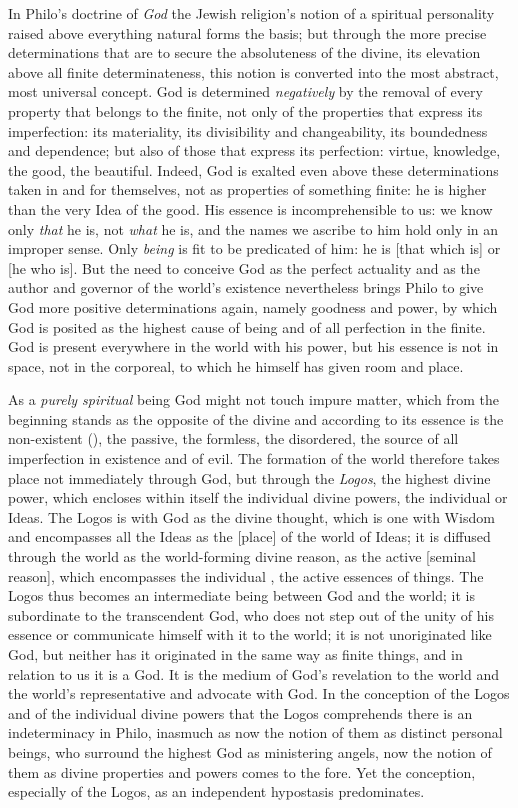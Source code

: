 In Philo's doctrine of \emph{God} the Jewish religion's notion of a
spiritual personality raised above everything natural forms the basis;
but through the more precise determinations that are to secure the
absoluteness of the divine, its elevation above all finite
determinateness, this notion is converted into the most abstract, most
universal concept. God is determined \emph{negatively} by the removal
of every property that belongs to the finite, not only of the
properties that express its imperfection: its materiality, its
divisibility and changeability, its boundedness and dependence; but
also of those that express its perfection: virtue, knowledge, the good,
the beautiful. Indeed, God is exalted even above these determinations
taken in and for themselves, not as properties of something finite: he
is higher than the very Idea of the good. His essence is
incomprehensible to us: we know only \emph{that} he is, not \emph{what}
he is, and the names we ascribe to him hold only in an improper sense.
Only \emph{being} is fit to be predicated of him: he is 
[that which is] or  [he who is]. But the need to conceive God
as the perfect actuality and as the author and governor of the world's
existence nevertheless brings Philo to give God more positive
determinations again, namely goodness and power, by which God is posited
as the highest cause of being and of all perfection in the finite. God
is present everywhere in the world with his power, but his essence is
not in space, not in the corporeal, to which he himself has given room
and place.

As a \emph{purely spiritual} being God might not touch impure matter,
which from the beginning stands as the opposite of the divine and
according to its essence is the non-existent (), the passive,
the formless, the disordered,
the source of all imperfection in existence and of evil.
The formation of the world therefore takes place not immediately
through God, but through the \emph{Logos}, the highest divine power,
which encloses within itself the individual divine powers, the
individual  or Ideas.
The Logos is with God as the divine thought, which is one with Wisdom
and encompasses all the Ideas as the  [place] of the world of
Ideas; it is diffused through the world as the world-forming divine
reason, as the active  [seminal reason], which
encompasses the individual , the active essences of things.
The Logos thus becomes an intermediate being between God and the world;
it is subordinate to the transcendent God, who does not step out of the
unity of his essence or communicate himself with it to the world; it is
not unoriginated like God, but neither has it originated in the same
way as finite things, and in relation to us it is a God. It is the
medium of God's revelation to the world and the world's representative
and advocate with God. In the conception of the Logos and of the
individual divine powers that the Logos comprehends there is an
indeterminacy in Philo, inasmuch as now the notion of them as distinct
personal beings, who surround the highest God as ministering angels,
now the notion of them as divine properties and powers comes to the
fore. Yet the conception, especially of the Logos, as an independent
hypostasis predominates.

